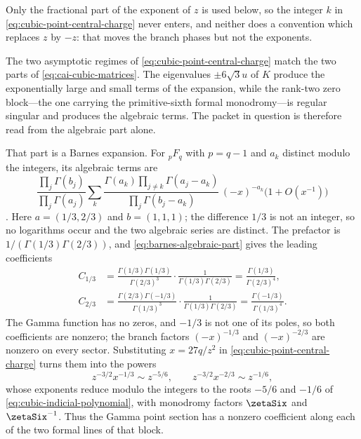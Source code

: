 Only the fractional part of the exponent of \(z\) is used below, so the
integer \(k\) in \eqref{eq:cubic-point-central-charge} never enters, and
neither does a convention which replaces \(z\) by \(-z\): that moves the
branch phases but not the exponents.

The two asymptotic regimes of \eqref{eq:cubic-point-central-charge} match the
two parts of \eqref{eq:cai-cubic-matrices}.  The eigenvalues
\(\pm6\sqrt3u\) of \(K\) produce the exponentially large and small terms of
the expansion, while the rank-two zero block---the one carrying the
primitive-sixth formal monodromy---is regular singular and produces the
algebraic terms.  The packet in question is therefore read from the algebraic
part alone.

That part is a Barnes expansion.  For \({}_pF_q\) with \(p=q-1\) and
\(a_k\) distinct modulo the integers, its algebraic terms are
\begin{equation}\label{eq:barnes-algebraic-part}
 \frac{\prod_{j}\Gamma(b_j)}{\prod_{j}\Gamma(a_j)}
 \sum_{k}
 \frac{\Gamma(a_k)\prod_{j\neq k}\Gamma(a_j-a_k)}
      {\prod_{j}\Gamma(b_j-a_k)}\,
 (-x)^{-a_k}\bigl(1+O(x^{-1})\bigr)
\end{equation}
\cite[Equations~16.11.2 and 16.11.8]{DLMF}.  Here \(a=(1/3,2/3)\) and
\(b=(1,1,1)\); the difference \(1/3\) is not an integer, so no logarithms
occur and the two algebraic series are distinct.  The prefactor is
\(1/(\Gamma(1/3)\Gamma(2/3))\), and \eqref{eq:barnes-algebraic-part} gives the
leading coefficients
\begin{equation}\label{eq:cubic-barnes-coefficients}
\begin{aligned}
 C_{1/3}&=\frac{\Gamma(1/3)\Gamma(1/3)}{\Gamma(2/3)^3}
   \cdot\frac{1}{\Gamma(1/3)\Gamma(2/3)}
  =\frac{\Gamma(1/3)}{\Gamma(2/3)^4},\\
 C_{2/3}&=\frac{\Gamma(2/3)\Gamma(-1/3)}{\Gamma(1/3)^3}
   \cdot\frac{1}{\Gamma(1/3)\Gamma(2/3)}
  =\frac{\Gamma(-1/3)}{\Gamma(1/3)^4}.
\end{aligned}
\end{equation}
The Gamma function has no zeros, and \(-1/3\) is not one of its poles, so both
coefficients are nonzero; the branch factors \((-x)^{-1/3}\) and
\((-x)^{-2/3}\) are nonzero on every sector.  Substituting \(x=27q/z^2\) in
\eqref{eq:cubic-point-central-charge} turns them into the powers
\begin{equation}\label{eq:cubic-barnes-z-powers}
 z^{-3/2}x^{-1/3}\sim z^{-5/6},
 \qquad
 z^{-3/2}x^{-2/3}\sim z^{-1/6},
\end{equation}
whose exponents reduce modulo the integers to the roots \(-5/6\) and
\(-1/6\) of \eqref{eq:cubic-indicial-polynomial}, with monodromy factors
\(\zetaSix\) and \(\zetaSix^{-1}\).  Thus the Gamma point section has a
nonzero coefficient along each of the two formal lines of that block.

